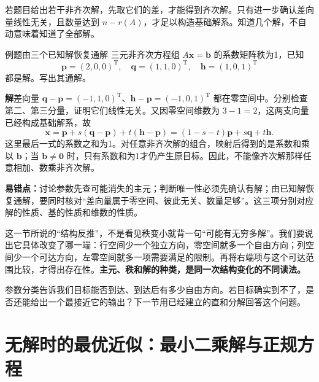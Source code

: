 \documentclass[a4paper,12pt,twoside,openany,fontset=none]{ctexbook}
\newcounter{example}[chapter]
\newenvironment{example}[1][]{\begin{exBox}{例题}{#1}}{\end{exBox}}
\numberwithin{equation}{chapter}
\begin{document}
若题目给出若干非齐次解，先取它们的差，才能得到齐次解。只有进一步确认差向量线性无关，且数量达到 $n-r(A)$，才足以构造基础解系。知道几个解，不自动意味着知道了全部解。

\begin{example}[由三个已知解恢复通解]
三元非齐次方程组 $A\boldsymbol x=\boldsymbol b$ 的系数矩阵秩为1，已知
\begin{equation}
 \boldsymbol p=(2,0,0)^{\mathrm T},\quad
 \boldsymbol q=(1,1,0)^{\mathrm T},\quad
 \boldsymbol h=(1,0,1)^{\mathrm T}
\end{equation}
都是解。写出其通解。
\end{example}
\textbf{解}\quad 差向量 $\boldsymbol q-\boldsymbol p=(-1,1,0)^{\mathrm T}$、$\boldsymbol h-\boldsymbol p=(-1,0,1)^{\mathrm T}$ 都在零空间中。分别检查第二、第三分量，证明它们线性无关。又因零空间维数为 $3-1=2$，这两支向量已经构成基础解系，故
\begin{equation}
 \boldsymbol x=\boldsymbol p+s(\boldsymbol q-\boldsymbol p)+t(\boldsymbol h-\boldsymbol p)
 =(1-s-t)\boldsymbol p+s\boldsymbol q+t\boldsymbol h.
\end{equation}
这里最后一式的系数之和为1。对任意非齐次解的组合，映射后得到的是系数和乘以 $\boldsymbol b$；当 $\boldsymbol b\ne\boldsymbol0$ 时，只有系数和为1才仍产生原目标。因此，不能像齐次解那样任意相加、数乘非齐次解。

\textbf{易错点：}讨论参数先查可能消失的主元；判断唯一性必须先确认有解；由已知解恢复通解，要同时核对“差向量属于零空间、彼此无关、数量足够”。这三项分别对应解的性质、基的性质和维数的性质。

这一节所说的“结构反推”，不是看见秩变小就背一句“可能有无穷多解”。我们要说出它具体改变了哪一端：行空间少一个独立方向，零空间就多一个自由方向；列空间少一个可达方向，左零空间就多一项需要满足的限制。再将右端项与这个可达范围比较，才得出存在性。\textbf{主元、秩和解的种类，是同一次结构变化的不同读法。}

参数分类告诉我们目标能否到达、到达后有多少自由方向。若目标确实到不了，是否还能给出一个最接近它的输出？下一节用已经建立的直和分解回答这个问题。

\clearpage
\section{无解时的最优近似：最小二乘解与正规方程}
\label{sec:five-least-squares}
\begingroup
\setlength{\parskip}{2pt}
\setlength{\abovedisplayskip}{5pt}\setlength{\belowdisplayskip}{5pt}
\newcommand{\FiveLSFigure}[4]{%
 \par\addvspace{5pt}\noindent\begin{minipage}{\linewidth}
 \begingroup\edef\FiveLSSavedFigure{\arabic{figure}}%
 \renewcommand{\thefigure}{\thechapter.7#1}%
 \renewcommand{\theHfigure}{\thechapter.leastsquares.#1}%
 \centering #4\par\captionof{figure}{#2}\label{#3}%
 \setcounter{figure}{\FiveLSSavedFigure}\endgroup
 \end{minipage}\par\addvspace{5pt}}
\end{document}
